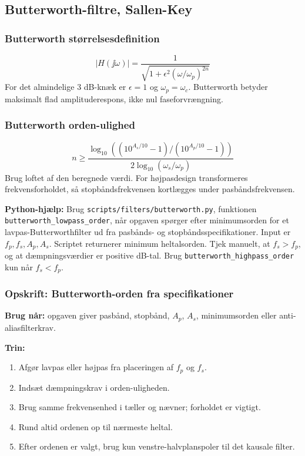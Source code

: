 \subsection{Butterworth-filtre, Sallen-Key}

\subsubsection{Butterworth størrelsesdefinition}
\[
|H(\jj\omega)|=\frac{1}{\sqrt{1+\epsilon^2(\omega/\omega_p)^{2n}}}
\]
For det almindelige \(3\) dB-knæk er \(\epsilon=1\) og \(\omega_p=\omega_c\). Butterworth betyder maksimalt flad amplituderespons, ikke nul faseforvrængning.

\subsubsection{Butterworth orden-ulighed}
\[
n\ge
\frac{\log_{10}\left((10^{A_s/10}-1)/(10^{A_p/10}-1)\right)}
{2\log_{10}(\omega_s/\omega_p)}
\]
Brug loftet af den beregnede værdi. For højpasdesign transformeres frekvensforholdet, så stopbåndsfrekvensen kortlægges under pasbåndsfrekvensen.

\textbf{Python-hjælp:} Brug \texttt{scripts/filters/butterworth.py}, funktionen \texttt{butterworth\_lowpass\_order}, når opgaven spørger efter minimumsorden for et lavpas-Butterworthfilter ud fra pasbånds- og stopbåndsspecifikationer. Input er \(f_p,f_s,A_p,A_s\). Scriptet returnerer minimum heltalsorden. Tjek manuelt, at \(f_s>f_p\), og at dæmpningsværdier er positive dB-tal. Brug \texttt{butterworth\_highpass\_order} kun når \(f_s<f_p\).

\subsubsection{Opskrift: Butterworth-orden fra specifikationer}
\textbf{Brug når:} opgaven giver pasbånd, stopbånd, \(A_p\), \(A_s\), minimumsorden eller anti-aliasfilterkrav.

\textbf{Trin:}
\begin{enumerate}
    \item Afgør lavpas eller højpas fra placeringen af \(f_p\) og \(f_s\).
    \item Indsæt dæmpningskrav i orden-uligheden.
    \item Brug samme frekvensenhed i tæller og nævner; forholdet er vigtigt.
    \item Rund altid ordenen op til nærmeste heltal.
    \item Efter ordenen er valgt, brug kun venstre-halvplanspoler til det kausale filter.
\end{enumerate}

